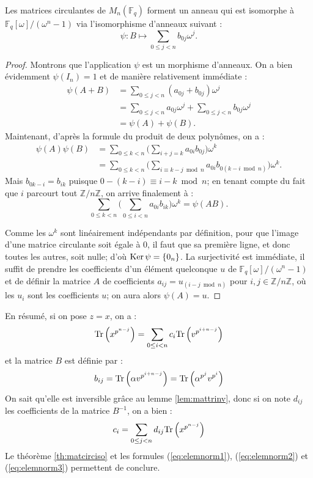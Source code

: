 \documentclass[a4paper]{article} %
\numberwithin{section}{part}
\numberwithin{equation}{section}
\newcommand\zmodn[1]{\mathbb{Z}/#1\mathbb{Z}}
\newcommand\GF[1]{\mathbb{F}_{#1}}
\newcommand\Tr[1]{\textup{Tr}\left(#1\right)}
\begin{document}
\begin{thm}
\label{th:matcirciso}
Les matrices circulantes de $M_n(\GF{q})$ forment un anneau qui est isomorphe à 
$\mathbb{F}_q[\omega]/(\omega^n - 1)$ \textup{via} l'isomorphisme d'anneaux
suivant :
\begin{equation*}
\label{eq:isomconvert}
\psi : B \longmapsto \sum_{0\leq j < n}{b_{0j}\omega^j}.
\end{equation*}
\end{thm}
\begin{proof}
Montrons que l'application $\psi$ est un morphisme d'anneaux. On a bien 
évidemment $\psi(I_n) = 1$ et de manière relativement immédiate :
\begin{align*}
\psi(A + B) &= \sum_{0\leq j < n}{(a_{0j} + b_{0j})\omega^j}\\
&= \sum_{0\leq j < n}{a_{0j}\omega^j} + \sum_{0\leq j < n}{b_{0j}\omega^j}\\
&= \psi(A) + \psi(B).
\end{align*}
Maintenant, d'après la formule du produit de deux polynômes, on a :
\begin{align*}
\psi(A)\psi(B) &= \sum_{0\leq k < n}
{\bigg(\sum_{i+j=k}{a_{0i}b_{0j}}\bigg)\omega^k}\\
&= \sum_{0\leq k < n}{\bigg(\sum_{i\equiv k-j \bmod n}{a_{0i}b_{0(k-i \bmod n)}}
\bigg)\omega^k}.
\end{align*}
Mais $b_{0k-i} = b_{ik}$ puisque $0 -(k-i) \equiv i-k \bmod n$; en tenant compte
du fait que $i$ parcourt tout $\zmodn{n}$, on arrive finalement à :
\[\sum_{0\leq k < n}{\bigg(\sum_{0\leq i < n}{a_{0i}b_{ik}}\bigg)\omega^k} = 
\psi(AB).\]\par
Comme les $\omega^k$ sont linéairement indépendants par définition, pour que 
l'image d'une matrice circulante soit égale à $0$, il faut que sa première 
ligne, et donc toutes les autres, soit nulle; d'où $\textup{Ker}\,\psi = 
\{0_n\}$. La surjectivité est immédiate, il suffit de prendre les coefficients 
d'un élément quelconque $u$ de $\GF{q}[\omega]/(\omega^n - 1)$ et de définir la 
matrice $A$ de coefficients $a_{ij} = u_{(i-j \bmod n)}$ pour $i,j\in\zmodn{n}$,
où les $u_i$ sont les coefficients $u$; on aura alors $\psi(A) = u$.
\end{proof}
En résumé, si on pose $z = x$, on a :
\[\textup{Tr}\left(x^{p^{n-j}}\right) = \sum_{0\leq i < n}{c_i\textup{Tr}
\left(v^{p^{i+n-j}}\right)}\]
et la matrice $B$ est définie par :
\[b_{ij} = \Tr{\alpha v^{p^{i+n-j}}} = \Tr{\alpha^{p^j}v^{p^i}}\]
On sait qu'elle est inversible grâce au lemme \ref{lem:mattrinv}, donc si on
note $d_{ij}$ les coefficients de la matrice $B^{-1}$, on a bien :
\[c_i = \sum_{0\leq j < n}{d_{ij}\textup{Tr}\left(x^{p^{n-j}}\right)}\]
Le théorème \ref{th:matcirciso} et les formules (\ref{eq:elemnorm1}),
(\ref{eq:elemnorm2}) et (\ref{eq:elemnorm3}) permettent de conclure.
\end{document}
